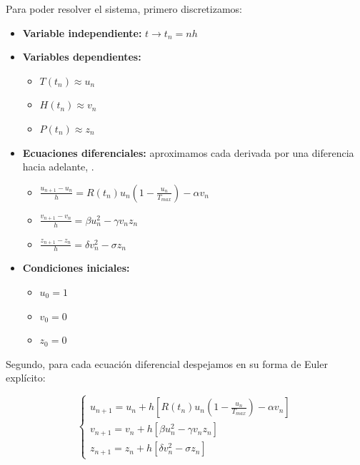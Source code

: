 Para poder resolver el sistema, primero discretizamos:
\begin{itemize}
    \item \textbf{Variable independiente:} $t \to t_n = nh$

    \item \textbf{Variables dependientes:}
    
    \begin{itemize}
        \item $T(t_n) \approx u_n$
        \item $H(t_n) \approx v_n$
        \item $P(t_n) \approx z_n$
    \end{itemize}

    \item \textbf{Ecuaciones diferenciales:} aproximamos cada derivada por una diferencia hacia adelante,
    .
    
    \begin{itemize}
        \item $\frac{u_{n+1} - u_n}{h} = R(t_n) u_n (1 - \frac{u_n}{T_{max}} ) - \alpha v_n$
        \item $\frac{v_{n+1} - v_n}{h} = \beta u_n^2 - \gamma v_n z_n$
        \item $\frac{z_{n+1} - z_n}{h} = \delta v_n^2 - \sigma z_n$
    \end{itemize}
    
    \item \textbf{Condiciones iniciales:}

    \begin{itemize}
        \item $u_0 = 1$
        \item $v_0 = 0$
        \item $z_0 = 0$
    \end{itemize}
    
\end{itemize}

Segundo, para cada ecuación diferencial despejamos en su forma de Euler explícito:

\begin{equation}
    \left\{ 
  \begin{array}{ll} 
    u_{n+1} = u_n + h [R(t_n) u_n (1 - \frac{u_n}{T_{max}} ) - \alpha v_n] \\ 
    v_{n+1} = v_n + h [\beta u_n^2 - \gamma v_n z_n] \\
    z_{n+1} = z_n + h [\delta v_n^2 - \sigma z_n]
  \end{array} 
\right.
\end{equation}

